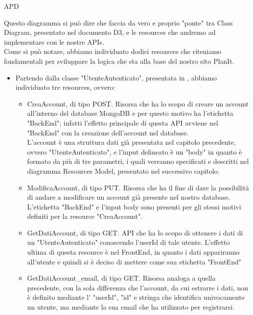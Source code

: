 \begin{listaPersonale} {APD}
    \begin{listaPersonale2}[APD]{}
        Questo diagramma si può dire che faccia da vero e proprio "ponte" tra Class Diagram, presentato nel documento D3, e le resources che andremo ad implementare con le nostre APIs. \\
        Come si può notare, abbiamo individuato dodici resources che riteniamo fondamentali per sviluppare la logica che sta alla base del nostro sito PlanIt. \\
        \begin{itemize}
            \item Partendo dalla classe "UtenteAutenticato", presentata in , abbiamo individuato tre resources, ovvero:
                  \begin{itemize}
                      \item CreaAccount, di tipo POST. Risorsa che ha lo scopo di creare un account all'interno del database MongoDB e per questo motivo ha l'etichetta "BackEnd"; infatti l'effetto principale di questa API avviene nel "BackEnd" con la creazione dell'account nel database.\\ L'account è una struttura dati già presentata nel capitolo precedente, ovvero "UtenteAutenticato", e l'input delineato è un "body" in quanto è formato da più di tre parametri, i quali verranno specificati e descritti nel diagramma Resources Model, presentato nel successivo capitolo.
                      \item ModificaAccount, di tipo PUT. Risorsa che ha il fine di dare la possibilità di andare a modificare un account già presente nel nostro database. L'etichetta "BackEnd" e l'input body sono presenti per gli stessi motivi definiti per la resource "CreaAccount".
                      \item GetDatiAccount, di tipo GET. API che ha lo scopo di ottenere i dati di un "UtenteAutenticato" conoscendo l'userId di tale utente. L'effetto ultima di questa resource è nel FrontEnd, in quanto i dati appariranno all'utente e quindi si è deciso di mettere come sua etichetta "FrontEnd"
                      \item GetDatiAccount\_email, di tipo GET. Risorsa analoga a quella precedente, con la sola differenza che l'account, da cui estrarre i dati, non è definito mediante l' "userId", "id" e stringa che identifica univocamente un utente, ma mediante la sua email che ha utilizzato per registrarsi.

\end{itemize}
\end{itemize}
\end{listaPersonale2}
\end{listaPersonale}
